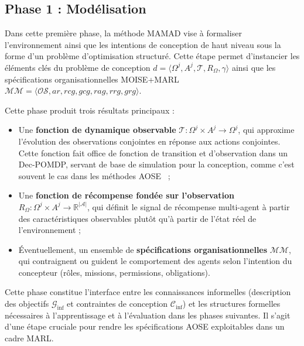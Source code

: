 \documentclass[pdflatex,sn-mathphys-num]{sn-jnl}%
\theoremstyle{thmstyleone}%
\theoremstyle{thmstyletwo}%
\theoremstyle{thmstylethree}%
\begin{document}


\subsection{Phase 1 : Modélisation}\label{sec:modelling}

Dans cette première phase, la méthode MAMAD vise à formaliser l'environnement ainsi que les intentions de conception de haut niveau sous la forme d'un problème d'optimisation structuré. Cette étape permet d'instancier les éléments clés du problème de conception $d = \langle \Omega^j, A^j, \mathcal{T}, R_{\Omega}, \gamma \rangle$ ainsi que les spécifications organisationnelles MOISE+MARL $\mathcal{MM} = \langle \mathcal{OS}, ar, rcg, gcg, rag, rrg, grg \rangle$.

Cette phase produit trois résultats principaux :

\begin{itemize}
    \item Une \textbf{fonction de dynamique observable} $\mathcal{T}: \Omega^j \times A^j \rightarrow \Omega^j$, qui approxime l'évolution des observations conjointes en réponse aux actions conjointes. Cette fonction fait office de fonction de transition et d'observation dans un Dec-POMDP, servant de base de simulation pour la conception, comme c'est souvent le cas dans les méthodes AOSE~\cite{Jamont2O15} ;
          
    \item Une \textbf{fonction de récompense fondée sur l'observation} $R_{\Omega}: \Omega^j \times A^j \rightarrow \mathbb{R}^{|\mathcal{A}|}$, qui définit le signal de récompense multi-agent à partir des caractéristiques observables plutôt qu'à partir de l'état réel de l'environnement ;
          
    \item Éventuellement, un ensemble de \textbf{spécifications organisationnelles} $\mathcal{MM}$, qui contraignent ou guident le comportement des agents selon l'intention du concepteur (rôles, missions, permissions, obligations).
\end{itemize}

Cette phase constitue l'interface entre les connaissances informelles (description des objectifs $\mathcal{G}_{\text{inf}}$ et contraintes de conception $\mathcal{C}_{\text{inf}}$) et les structures formelles nécessaires à l'apprentissage et à l'évaluation dans les phases suivantes. Il s'agit d'une étape cruciale pour rendre les spécifications AOSE exploitables dans un cadre MARL.
\end{document}
